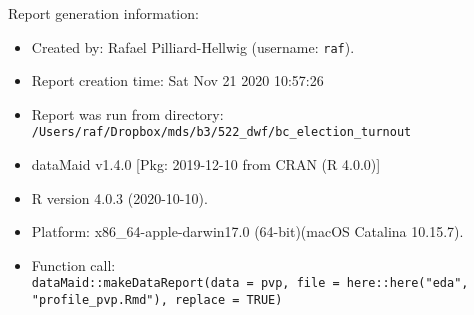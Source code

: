 \documentclass[
]{report}
\begin{document}
\noindent\makebox[\linewidth]{\rule{\textwidth}{0.4pt}}

Report generation information:

\begin{itemize}
\item
  Created by: Rafael Pilliard-Hellwig (username: \texttt{raf}).
\item
  Report creation time: Sat Nov 21 2020 10:57:26
\item
  Report was run from directory:
  \texttt{/Users/raf/Dropbox/mds/b3/522\_dwf/bc\_election\_turnout}
\item
  dataMaid v1.4.0 {[}Pkg: 2019-12-10 from CRAN (R 4.0.0){]}
\item
  R version 4.0.3 (2020-10-10).
\item
  Platform: x86\_64-apple-darwin17.0 (64-bit)(macOS Catalina 10.15.7).
\item
  Function call:
  \texttt{dataMaid::makeDataReport(data\ =\ pvp,\ file\ =\ here::here("eda",\ \ \ \ \ \ "profile\_pvp.Rmd"),\ replace\ =\ TRUE)}
\end{itemize}
\end{document}
